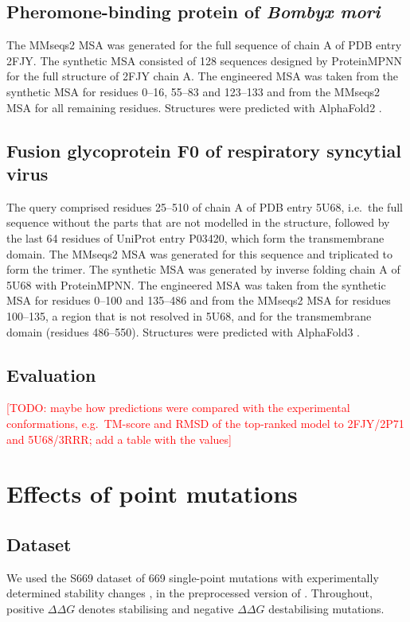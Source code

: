 \documentclass[11pt,a4paper]{article}
\newcommand{\TODO}[1]{\textcolor{red}{[TODO: #1]}}
\begin{document}
\subsection{Pheromone-binding protein of \textit{Bombyx mori}}
The MMseqs2 MSA was generated for the full sequence of chain A of PDB entry 2FJY. The synthetic MSA consisted of 128 sequences designed by ProteinMPNN for the full structure of 2FJY chain A.
The engineered MSA was taken from the synthetic MSA for residues 0--16, 55--83 and 123--133 and from the MMseqs2 MSA for all remaining residues.
Structures were predicted with AlphaFold2 \cite{alphafold2}.

\subsection{Fusion glycoprotein F0 of respiratory syncytial virus}
The query comprised residues 25--510 of chain A of PDB entry 5U68, i.e.\ the full sequence without the parts that are not modelled in the structure, followed by the last 64 residues of UniProt entry P03420, which form the transmembrane domain. The MMseqs2 MSA was generated for this sequence and triplicated to form the trimer.
The synthetic MSA was generated by inverse folding chain A of 5U68 with ProteinMPNN. The engineered MSA was taken from the synthetic MSA for residues 0--100 and 135--486 and from the MMseqs2 MSA for residues 100--135, a region that is not resolved in 5U68, and for the transmembrane domain (residues 486--550).
Structures were predicted with AlphaFold3 \cite{alphafold3}.

\subsection{Evaluation}
\TODO{maybe how predictions were compared with the experimental conformations, e.g.\ TM-score and RMSD of the top-ranked model to 2FJY/2P71 and 5U68/3RRR; add a table with the values}

\section{Effects of point mutations}\label{sec:mutations}
\subsection{Dataset}
We used the S669 dataset of 669 single-point mutations with experimentally determined stability changes \cite{stability_dataset}, in the preprocessed version of \cite{stability_dataset_fixed}.
Throughout, positive $\Delta\Delta G$ denotes stabilising and negative $\Delta\Delta G$ destabilising mutations.
\end{document}
